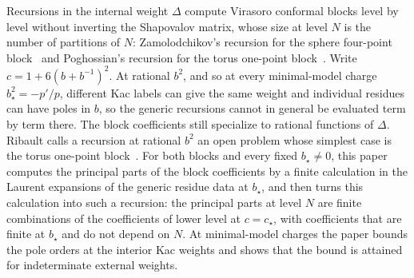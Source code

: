 \documentclass[twoside,10pt]{article}
\numberwithin{equation}{section}
\theoremstyle{slbody}
\theoremstyle{definition}
\theoremstyle{remark}
\begin{document}
Recursions in the internal weight \(\Delta\) compute Virasoro conformal
blocks level by level without inverting the Shapovalov matrix, whose size at
level \(N\) is the number of partitions of \(N\): Zamolodchikov's recursion
for the sphere four-point block~\cite{Zamolodchikov1987} and Poghossian's
recursion for the torus one-point block~\cite[\S5]{Poghossian2009}.  Write
\(c=1+6(b+b^{-1})^2\).  At rational \(b^2\), and so at every minimal-model
charge \(b_\star^2=-p'/p\), different Kac labels can give the same weight and
individual residues can have poles in \(b\), so the generic recursions cannot
in general be evaluated term by term there.  The block coefficients still
specialize to rational functions of \(\Delta\).  Ribault calls a recursion at
rational \(b^2\) an open problem whose simplest case is the torus one-point
block~\cite[\S4.3.3]{Ribault2026}.  For both blocks and every fixed
\(b_\star\neq0\), this paper computes the principal parts of the block
coefficients by a finite calculation in the Laurent expansions of the
generic residue data at \(b_\star\), and then turns this calculation into
such a recursion: the principal parts at level \(N\) are finite combinations
of the coefficients of lower level at \(c=c_\star\), with coefficients that
are finite at \(b_\star\) and do not depend on \(N\).  At minimal-model
charges the paper bounds the pole orders at the interior Kac weights and
shows that the bound is attained for indeterminate external weights.
\end{document}
